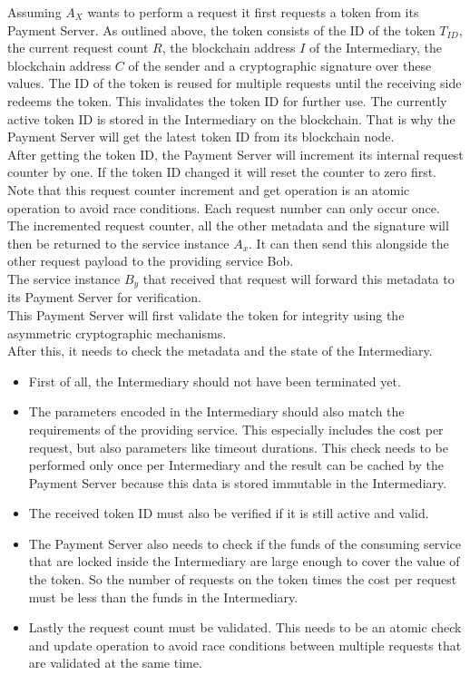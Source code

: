 \documentclass[a4paper,12pt]{scrartcl}
\begin{document}
Assuming $A_X$ wants to perform a request it first requests a token from its Payment Server. As outlined above, the token consists of the ID of the token $T_{ID}$, the current request count $R$, the blockchain address $I$ of the Intermediary, the blockchain address $C$ of the sender and a cryptographic signature over these values. The ID of the token is reused for multiple requests until the receiving side redeems the token. This invalidates the token ID for further use. The currently active token ID is stored in the Intermediary on the blockchain. That is why the Payment Server will get the latest token ID from its blockchain node.\\
After getting the token ID, the Payment Server will increment its internal request counter by one. If the token ID changed it will reset the counter to zero first. Note that this request counter increment and get operation is an atomic operation to avoid race conditions. Each request number can only occur once.\\
The incremented request counter, all the other metadata and the signature will then be returned to the service instance $A_x$. It can then send this alongside the other request payload to the providing service Bob.\\

The service instance $B_y$ that received that request will forward this metadata to its Payment Server for verification.\\
This Payment Server will first validate the token for integrity using the asymmetric cryptographic mechanisms.\\

After this, it needs to check the metadata and the state of the Intermediary.

\begin{itemize}
\item First of all, the Intermediary should not have been terminated yet.
\item The parameters encoded in the Intermediary should also match the requirements of the providing service. This especially includes the cost per request, but also parameters like timeout durations. This check needs to be performed only once per Intermediary and the result can be cached by the Payment Server because this data is stored immutable in the Intermediary.
\item The received token ID must also be verified if it is still active and valid.
\item The Payment Server also needs to check if the funds of the consuming service that are locked inside the Intermediary are large enough to cover the value of the token. So the number of requests on the token times the cost per request must be less than the funds in the Intermediary.
\item Lastly the request count must be validated. This needs to be an atomic check and update operation to avoid race conditions between multiple requests that are validated at the same time.
\end{itemize}
\end{document}

